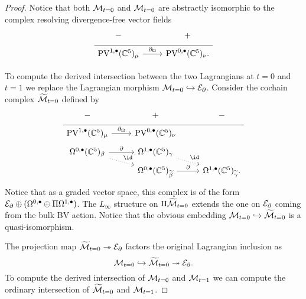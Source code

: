\begin{proof}
Notice that both $\mathcal M_{t=0}$ and $\mathcal M_{t=0}$ are abstractly isomorphic to the complex resolving divergence-free vector fields
\begin{equation}
  \label{eq:lin2} 
  \begin{tikzcd}[row sep = 1 ex]
    - & + \\ \hline
    \PV^{1,\bu}(\CC^5)_\mu \ar[r, "\div"] & \PV^{0,\bu}(\CC^5)_\nu  .
\end{tikzcd}
\end{equation}

To compute the derived intersection between the two Lagrangians at $t=0$ and $t=1$ we replace the Lagrangian morphism $\mathcal M_{t=0} \hookrightarrow \mathcal E_{\partial}$. 
Consider the cochain complex $\widetilde {\mathcal M}_{t=0}$ defined by
\begin{equation}
  \label{eq:lin3} 
  \begin{tikzcd}[row sep = 1 ex]
    - & + & - \\ \hline
    \PV^{1,\bu}(\CC^5)_\mu \ar[r, "\div"] & \PV^{0,\bu}(\CC^5)_\nu \\ 
     \Omega^{0,\bu}(\CC^5)_\beta \ar[dr,dotted,"\id"]\ar[r, "\del"] & \Omega^{1,\bu}(\CC^5)_\gamma \ar[dr,dotted,"\id"] \\
     & \Omega^{0,\bu}(\CC^5)_{\til\beta} \ar[r, "\del"] & \Omega^{1,\bu}(\CC^5)_{\til\gamma} .
\end{tikzcd}
\end{equation}
Notice that as a graded vector space, this complex is of the form $\mathcal E_{\partial} \oplus (\Omega^{0,\bullet} \oplus \Pi \Omega^{1,\bullet})$. 
The $L_\infty$ structure on $\Pi \widetilde {\mathcal M}_{t=0}$ extends the one on $\mathcal E_{\partial}$ coming from the bulk BV action. 
Notice that the obvious embedding $\mathcal M_{t=0} \hookrightarrow \widetilde {\mathcal M}_{t=0}$ is a quasi-isomorphism.

The projection map $\widetilde {\mathcal M}_{t=0} \twoheadrightarrow \mathcal E_{\partial}$ factors the original Lagrangian inclusion as
\[
\mathcal M_{t=0} \hookrightarrow \widetilde {\mathcal M}_{t=0} \twoheadrightarrow \mathcal E_{\partial} .
\]
To compute the derived intersection of $\mathcal M_{t=0}$ and $\mathcal M_{t=1}$ we can compute the ordinary intersection of $\widetilde {\mathcal M}_{t=0}$ and $\mathcal M_{t=1}$. 


\end{proof}
